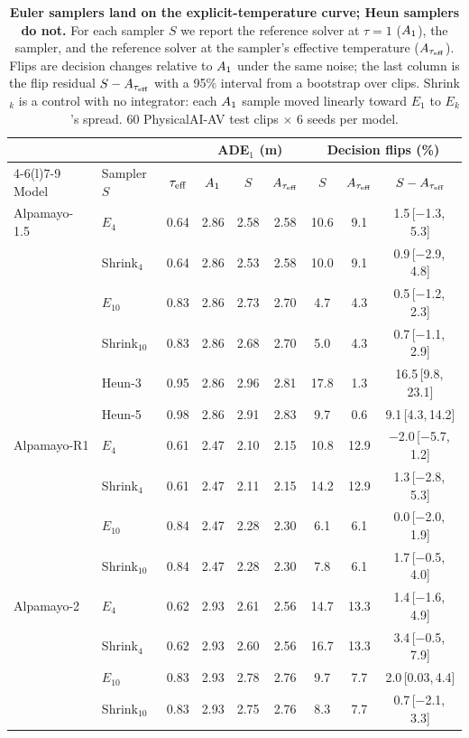 \begin{table}[t]
  \caption{\textbf{Euler samplers land on the explicit-temperature curve; Heun samplers do not.} For each sampler $S$ we report the reference solver at $\tau{=}1$ ($A_{1}$), the sampler, and the reference solver at the sampler's effective temperature ($A_{\tau_{\mathrm{eff}}}$). Flips are decision changes relative to $A_{1}$ under the same noise; the last column is the flip residual $S-A_{\tau_{\mathrm{eff}}}$ with a 95\% interval from a bootstrap over clips. Shrink$_k$ is a control with no integrator: each $A_{1}$ sample moved linearly toward $E_1$ to $E_k$'s spread. 60 PhysicalAI-AV test clips $\times$ 6 seeds per model.}
  \label{tab:matched}
  \centering\small\setlength{\tabcolsep}{5pt}
  \begin{tabular}{@{}llccccccc@{}}
    \toprule
    & & & \multicolumn{3}{c}{ADE$_1$ (m)} & \multicolumn{3}{c}{Decision flips (\%)} \\
    \cmidrule(lr){4-6}\cmidrule(l){7-9}
    Model & Sampler $S$ & $\tau_{\mathrm{eff}}$ & $A_{1}$ & $S$ & $A_{\tau_{\mathrm{eff}}}$ & $S$ & $A_{\tau_{\mathrm{eff}}}$ & $S-A_{\tau_{\mathrm{eff}}}$ \\
    \midrule
    Alpamayo-1.5 & $E_4$ & 0.64 & 2.86 & 2.58 & 2.58 & 10.6 & 9.1 & 1.5\,{\scriptsize[$-$1.3,\,5.3]} \\
     & Shrink$_4$ & 0.64 & 2.86 & 2.53 & 2.58 & 10.0 & 9.1 & 0.9\,{\scriptsize[$-$2.9,\,4.8]} \\
     & $E_{10}$ & 0.83 & 2.86 & 2.73 & 2.70 & 4.7 & 4.3 & 0.5\,{\scriptsize[$-$1.2,\,2.3]} \\
     & Shrink$_{10}$ & 0.83 & 2.86 & 2.68 & 2.70 & 5.0 & 4.3 & 0.7\,{\scriptsize[$-$1.1,\,2.9]} \\
     & Heun-3 & 0.95 & 2.86 & 2.96 & 2.81 & 17.8 & 1.3 & 16.5\,{\scriptsize[9.8,\,23.1]} \\
     & Heun-5 & 0.98 & 2.86 & 2.91 & 2.83 & 9.7 & 0.6 & 9.1\,{\scriptsize[4.3,\,14.2]} \\
    \midrule
    Alpamayo-R1 & $E_4$ & 0.61 & 2.47 & 2.10 & 2.15 & 10.8 & 12.9 & $-$2.0\,{\scriptsize[$-$5.7,\,1.2]} \\
     & Shrink$_4$ & 0.61 & 2.47 & 2.11 & 2.15 & 14.2 & 12.9 & 1.3\,{\scriptsize[$-$2.8,\,5.3]} \\
     & $E_{10}$ & 0.84 & 2.47 & 2.28 & 2.30 & 6.1 & 6.1 & 0.0\,{\scriptsize[$-$2.0,\,1.9]} \\
     & Shrink$_{10}$ & 0.84 & 2.47 & 2.28 & 2.30 & 7.8 & 6.1 & 1.7\,{\scriptsize[$-$0.5,\,4.0]} \\
    \midrule
    Alpamayo-2 & $E_4$ & 0.62 & 2.93 & 2.61 & 2.56 & 14.7 & 13.3 & 1.4\,{\scriptsize[$-$1.6,\,4.9]} \\
     & Shrink$_4$ & 0.62 & 2.93 & 2.60 & 2.56 & 16.7 & 13.3 & 3.4\,{\scriptsize[$-$0.5,\,7.9]} \\
     & $E_{10}$ & 0.83 & 2.93 & 2.78 & 2.76 & 9.7 & 7.7 & 2.0\,{\scriptsize[0.03,\,4.4]} \\
     & Shrink$_{10}$ & 0.83 & 2.93 & 2.75 & 2.76 & 8.3 & 7.7 & 0.7\,{\scriptsize[$-$2.1,\,3.3]} \\
    \bottomrule
  \end{tabular}
\end{table}
